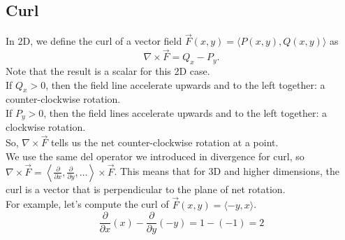 \subsection{Curl}
\noindent
In 2D, we define the curl of a vector field $\vec{F}(x,y) = \langle P(x,y), Q(x,y) \rangle$ as
\begin{equation*}
	\nabla \times \vec{F} = Q_x - P_y.
\end{equation*}
Note that the result is a scalar for this 2D case.\\
If $Q_x > 0$, then the field line accelerate upwards and to the left together: a counter-clockwise rotation.\\
If $P_y > 0$, then the field lines accelerate upwards and to the left together: a clockwise rotation.\\
So, $\nabla \times \vec{F}$ tells us the net counter-clockwise rotation at a point.\\

\noindent
We use the same del operator we introduced in divergence for curl, so $\nabla \times \vec{F} = \left< \frac{\partial}{\partial x}, \frac{\partial}{\partial y},\ldots \right> \times \vec{F}$. This means that for 3D and higher dimensions, the curl is a vector that is perpendicular to the plane of net rotation.\\

\noindent
For example, let's compute the curl of $\vec{F}(x,y) = \langle -y, x \rangle$.\\
\begin{equation*}
	\frac{\partial}{\partial x}(x) - \frac{\partial}{\partial y}(-y) = 1-(-1) = 2
\end{equation*}


